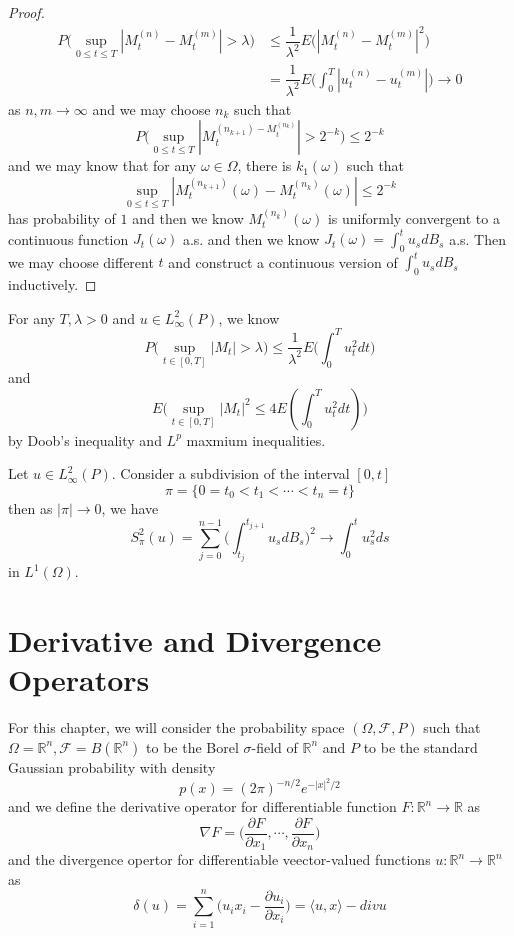 \documentclass[lang=en, color=blue, ]{elegantbook}
\newcommand{\F}{\mathcal{F}}
\newcommand{\R}{\mathbb{R}}
\begin{document}
\begin{proof}
    \[
    \begin{aligned}
    P\Big(\sup_{0\leq t\leq T}|M_t^{(n)} - M_t^{(m)}| > \lambda\Big) &\leq \dfrac{1}{\lambda^2}E\Big(|M_t^{(n)} - M_t^{(m)}|^2\Big) \\
    & = \dfrac{1}{\lambda^2}E\Big(\int_0^T |u_t^{(n)} - u_t^{(m)}|\Big) \to 0
    \end{aligned}
    \]
    as $n,m \to \infty$ and we may choose $n_k$ such that
    \[
    P\Big(\sup_{0\leq t\leq T}|M_t^{(n_{k+1}) - M_t^{(n_k)}}| > 2^{-k}\Big) \leq 2^{-k}
    \]
    and we may know that for any $\omega \in \Omega$, there is $k_1(\omega)$ such that
    \[
    \sup_{0\leq t\leq T}|M_t^{(n_{k+1})}(\omega) - M_t^{(n_{k})}(\omega)| \leq 2^{-k}
    \]
    has probability of $1$ and then we know $M_t^{(n_k)}(\omega)$ is uniformly convergent to a continuous function $J_t(\omega)$ a.s. and then we know $J_t(\omega) = \int_0^t u_s dB_s$ a.s. Then we may choose different $t$ and construct a continuous version of $\int_0^t u_s dB_s$ inductively.
\end{proof}

\begin{proposition}
    For any $T,\lambda > 0$ and $u\in L^2_{\infty}(P)$, we know
    \[
    P\Big(\sup_{t\in [0,T]} |M_t| > \lambda \Big) \leq \dfrac{1}{\lambda^2}E\Big(\int_0^T u_t^2 dt\Big)
    \]
    and
    \[
    E\Big(\sup_{t\in [0,T]}|M_t|^2 \leq 4 E(\int_0^T u_t^2 dt)\Big)
    \]
    by Doob's inequality and $L^p$ maxmium inequalities.
\end{proposition}

\begin{proposition}
    Let $u \in L^2_{\infty}(P)$. Consider a subdivision of the interval $[0,t]$
    \[
    \pi = \{0 = t_0 < t_1 < \cdots < t_n = t\}
    \]
    then as $|\pi| \to 0$, we have
    \[
    S_{\pi}^2(u) = \sum\limits_{j=0}^{n-1}\Big( \int_{t_j}^{t_{j+1}} u_s dB_s\Big)^2 \to \int_0^t u_s^2 ds
    \]
    in $L^1(\Omega)$.
\end{proposition}

\section{Derivative and Divergence Operators}

\begin{definition}
    For this chapter, we will consider the probability space $(\Omega,\F,P)$ such that $\Omega = \R^n, \F = B(\R^n)$ to be the Borel $\sigma$-field of $\R^n$ and $P$ to be the standard Gaussian probability with density
    \[
    p(x) = (2\pi)^{-n/2}e^{-|x|^2/2}
    \]
    and we define the derivative operator for differentiable function $F:\R^n \to \R$ as
    \[
    \nabla F = \Big(\dfrac{\partial F}{\partial x_1},\cdots,\dfrac{\partial F}{\partial x_n}\Big)
    \]
    and the divergence opertor for differentiable veector-valued functions $u:\R^n\to\R^n$ as
    \[
    \delta(u) = \sum\limits_{i=1}^n \Big( u_ix_i - \dfrac{\partial u_i}{\partial x_i}\Big) = \langle u,x\rangle - div u
    \]
\end{definition}
\end{document}
